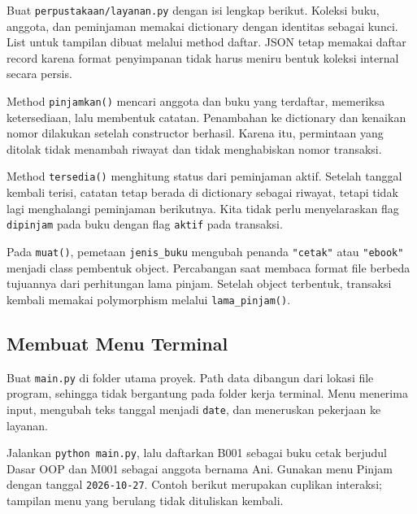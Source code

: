 Buat \texttt{perpustakaan/layanan.py} dengan isi lengkap berikut. Koleksi buku, anggota, dan peminjaman memakai dictionary dengan identitas sebagai kunci. List untuk tampilan dibuat melalui method daftar. JSON tetap memakai daftar record karena format penyimpanan tidak harus meniru bentuk koleksi internal secara persis.

\begin{kode}
\end{kode}

Method \texttt{pinjamkan()} mencari anggota dan buku yang terdaftar, memeriksa ketersediaan, lalu membentuk catatan. Penambahan ke dictionary dan kenaikan nomor dilakukan setelah constructor berhasil. Karena itu, permintaan yang ditolak tidak menambah riwayat dan tidak menghabiskan nomor transaksi.

Method \texttt{tersedia()} menghitung status dari peminjaman aktif. Setelah tanggal kembali terisi, catatan tetap berada di dictionary sebagai riwayat, tetapi tidak lagi menghalangi peminjaman berikutnya. Kita tidak perlu menyelaraskan flag \texttt{dipinjam} pada buku dengan flag \texttt{aktif} pada transaksi.

Pada \texttt{muat()}, pemetaan \texttt{jenis\_buku} mengubah penanda \texttt{"cetak"} atau \texttt{"ebook"} menjadi class pembentuk object. Percabangan saat membaca format file berbeda tujuannya dari perhitungan lama pinjam. Setelah object terbentuk, transaksi kembali memakai polymorphism melalui \texttt{lama\_pinjam()}.

\subsection{Membuat Menu Terminal}

Buat \texttt{main.py} di folder utama proyek. Path data dibangun dari lokasi file program, sehingga tidak bergantung pada folder kerja terminal. Menu menerima input, mengubah teks tanggal menjadi \texttt{date}, dan meneruskan pekerjaan ke layanan.

\begin{kode}[main.py]
\end{kode}

Jalankan \texttt{python main.py}, lalu daftarkan B001 sebagai buku cetak berjudul Dasar OOP dan M001 sebagai anggota bernama Ani. Gunakan menu Pinjam dengan tanggal \texttt{2026-10-27}. Contoh berikut merupakan cuplikan interaksi; tampilan menu yang berulang tidak dituliskan kembali.

